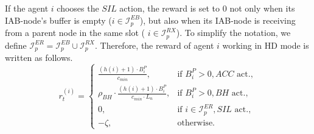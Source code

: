 If the agent $i$ chooses the $SIL$ action, the reward is set to $0$ not only when its IAB-node's buffer is empty ($i \in \mathcal{I}_p^{EB}$), but also when its IAB-node is receiving from a parent node in the same slot ( $i \in \mathcal{I}_p^{RX}$). To simplify the notation, we define $\mathcal{I}_p^{ER} = \mathcal{I}_p^{EB} \cup \mathcal{I}_p^{RX}$. Therefore, the reward of agent $i$ working in HD mode is written as follows.
\begin{equation}
    r^{(i)}_t = \left\{ \begin{array}{lll}
        \frac{(h(i)+1) \cdot B^P_i}{c_{min}}, & \text{if } B^P_i > 0, ACC \mbox{ act.},\\
        \rho_{BH} \cdot \frac{(h(i)+1)\cdot B^P_i}{c_{min}\cdot L_n}, & \text{if } B^P_i> 0, BH \mbox{ act.},\\
        0, & \text{if } i \in \mathcal{I}^{ER}_p, SIL \mbox{ act.},\\
        -\zeta, & \text{otherwise}.
    \end{array}\right.
    \label{reward_iab_donor}
\end{equation}


